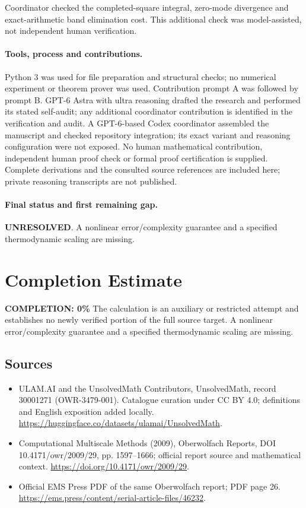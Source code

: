 \documentclass[11pt]{article}
\begin{document}
Coordinator checked the completed-square integral, zero-mode divergence and exact-arithmetic band elimination cost. This additional check was model-assisted, not independent human verification.

\paragraph{Tools, process and contributions.}
Python 3 was used for file preparation and structural checks; no numerical experiment or theorem prover was used. Contribution prompt A was followed by prompt B. GPT-6 Astra with ultra reasoning drafted the research and performed its stated self-audit; any additional coordinator contribution is identified in the verification and audit. A GPT-6-based Codex coordinator assembled the manuscript and checked repository integration; its exact variant and reasoning configuration were not exposed. No human mathematical contribution, independent human proof check or formal proof certification is supplied. Complete derivations and the consulted source references are included here; private reasoning transcripts are not published.

\paragraph{Final status and first remaining gap.}
\textbf{UNRESOLVED}. A nonlinear error/complexity guarantee and a specified thermodynamic scaling are missing.

\section{Completion Estimate}
\noindent\textbf{COMPLETION: 0\%}
The calculation is an auxiliary or restricted attempt and establishes no newly verified portion of the full source target. A nonlinear error/complexity guarantee and a specified thermodynamic scaling are missing.

\subsection{Sources}
\begin{itemize}
\item[\hypertarget{source:30001271:1}{S1}] ULAM.AI and the UnsolvedMath Contributors, UnsolvedMath, record 30001271 (OWR-3479-001). Catalogue curation under CC BY 4.0; definitions and English exposition added locally.
\url{https://huggingface.co/datasets/ulamai/UnsolvedMath}.
\item[\hypertarget{source:30001271:2}{S2}] Computational Multiscale Methods (2009), Oberwolfach Reports, DOI 10.4171/owr/2009/29, pp. 1597--1666; official report source and mathematical context.
\url{https://doi.org/10.4171/owr/2009/29}.
\item[\hypertarget{source:30001271:3}{S3}] Official EMS Press PDF of the same Oberwolfach report; PDF page 26.
\url{https://ems.press/content/serial-article-files/46232}.
\end{itemize}
\label{end:30001271}
\end{document}
